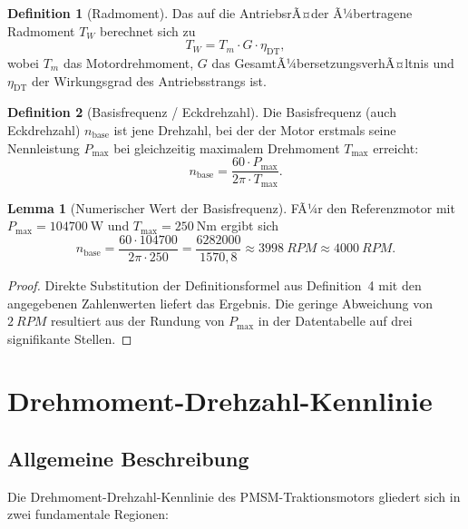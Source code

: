 ﻿\documentclass[a4paper,12pt]{article}
\theoremstyle{definition}
\newtheorem{definition}{Definition}
\newtheorem{lemma}{Lemma}
\begin{document}
\begin{definition}[Radmoment]
    Das auf die AntriebsrÃ¤der Ã¼bertragene Radmoment $T_W$ berechnet sich zu
    \[
        T_W = T_m \cdot G \cdot \eta_{\mathrm{DT}},
    \]
    wobei $T_m$ das Motordrehmoment, $G$ das GesamtÃ¼bersetzungsverhÃ¤ltnis und
    $\eta_{\mathrm{DT}}$ der Wirkungsgrad des Antriebsstrangs ist.
\end{definition}

\begin{definition}[Basisfrequenz / Eckdrehzahl]
    Die Basisfrequenz (auch Eckdrehzahl) $n_{\mathrm{base}}$ ist jene Drehzahl,
    bei der der Motor erstmals seine Nennleistung $P_{\max}$ bei gleichzeitig maximalem
    Drehmoment $T_{\max}$ erreicht:
    \[
        n_{\mathrm{base}} = \frac{60 \cdot P_{\max}}{2\pi \cdot T_{\max}}.
    \]
\end{definition}

\begin{lemma}[Numerischer Wert der Basisfrequenz]
\label{lem:nbase}
    FÃ¼r den Referenzmotor mit $P_{\max} = \SI{104700}{\watt}$ und
    $T_{\max} = \SI{250}{\newton\metre}$ ergibt sich
    \[
        n_{\mathrm{base}}
        = \frac{60 \cdot 104700}{2\pi \cdot 250}
        = \frac{6282000}{1570{,}8}
        \approx \SI{3998}{RPM} \approx \SI{4000}{RPM}.
    \]
\end{lemma}

\begin{proof}
    Direkte Substitution der Definitionsformel aus Definition~4 mit den
    angegebenen Zahlenwerten liefert das Ergebnis. Die geringe Abweichung von
    $\SI{2}{RPM}$ resultiert aus der Rundung von $P_{\max}$ in der Datentabelle
    auf drei signifikante Stellen.
\end{proof}

\section{Drehmoment-Drehzahl-Kennlinie}
\label{sec:kennlinie}

\subsection{Allgemeine Beschreibung}

Die Drehmoment-Drehzahl-Kennlinie des PMSM-Traktionsmotors gliedert sich in
zwei fundamentale Regionen:
\end{document}

